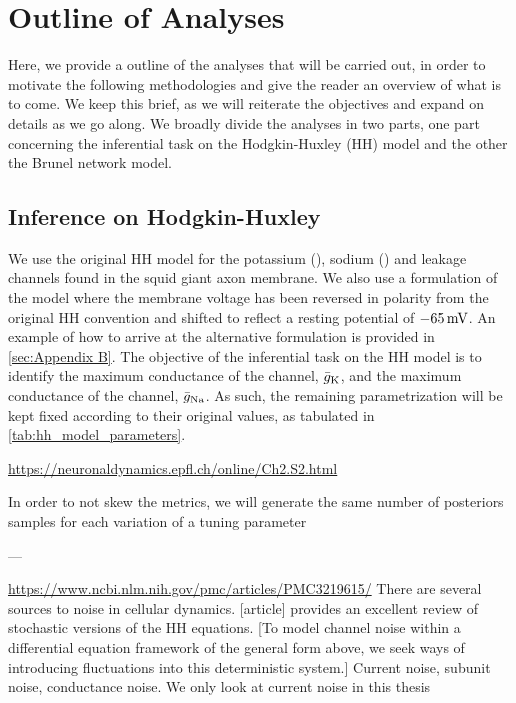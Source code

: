 \section{Outline of Analyses}

Here, we provide a outline of the analyses that will be carried out, in order to motivate the following methodologies and give the reader an overview of what is to come. We keep this brief, as we will reiterate the objectives and expand on details as we go along. We broadly divide the analyses in two parts, one part concerning the inferential task on the Hodgkin-Huxley (HH) model and the other the Brunel network model. 

\subsection{Inference on Hodgkin-Huxley}

We use the original HH model for the potassium (\K), sodium (\Na) and leakage channels found in the squid giant axon membrane. We also use a formulation of the model where the membrane voltage has been reversed in polarity from the original HH convention and shifted to reflect a resting potential of $-65 \,\mathrm{mV}$. An example of how to arrive at the alternative formulation is provided in \autoref{sec:Appendix B}. The objective of the inferential task on the HH model is to identify the maximum conductance of the \K channel, $\bar{g}_{\mathrm{K}}$, and the maximum conductance of the \Na channel, $\bar{g}_{\mathrm{Na}}$. As such, the remaining parametrization will be kept fixed according to their original values, as tabulated in \autoref{tab:hh_model_parameters}.



\url{https://neuronaldynamics.epfl.ch/online/Ch2.S2.html}


In order to not skew the metrics, we will generate the same number of posteriors samples for each variation of a tuning parameter

---

\url{https://www.ncbi.nlm.nih.gov/pmc/articles/PMC3219615/}
There are several sources to noise in cellular dynamics. [article] provides an excellent review of stochastic versions of the HH equations. [To model channel noise within a differential equation framework of the general form above, we seek ways of introducing fluctuations into this deterministic system.] Current noise, subunit noise, conductance noise. We only look at current noise in this thesis

